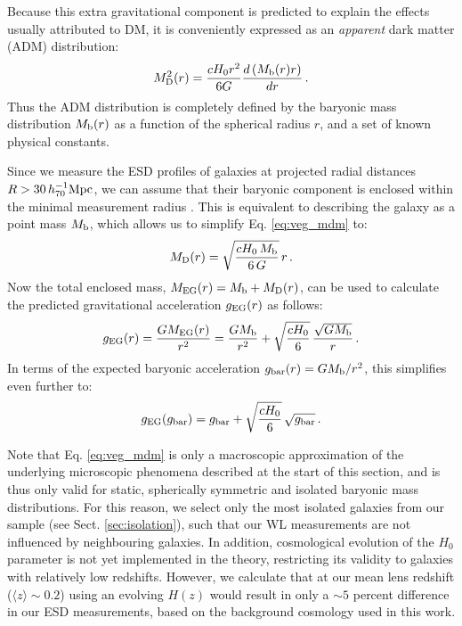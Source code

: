 \documentclass[usenatbib]{mnras}
\newcommand{\hsMpc}{\, h_{70}^{-1}{\rm{Mpc}} }
\newcommand{\un}[1]{_{\rm #1}}
\begin{document}
Because this extra gravitational component is predicted to explain the effects usually attributed to DM, it is conveniently expressed as an \emph{apparent} dark matter (ADM) distribution:
\begin{equation}
M\un{D}^2 (r) = \frac{  cH_0 r^2}{6G} \frac{d\left( M\un{b}(r) r \right)}{dr} \, .
\label{eq:veg_mdm}
\end{equation}
Thus the ADM distribution is completely defined by the baryonic mass distribution $M\un{b}(r)$ as a function of the spherical radius $r$, and a set of known physical constants.

Since we measure the ESD profiles of galaxies at projected radial distances $R>30 \hsMpc$, we can assume that their baryonic component is enclosed within the minimal measurement radius \cite[see also][]{brouwer2017}. This is equivalent to describing the galaxy as a point mass $M\un{b}$, which allows us to simplify Eq. \ref{eq:veg_mdm} to:
\begin{equation}
M\un{D}(r)=\sqrt{\frac{cH_{0} \, M\un{b}}{6 \, G}} \, r \, .
\end{equation}
Now the total enclosed mass, $M\un{EG}(r) = M\un{b} + M\un{D}(r)$, can be used to calculate the predicted gravitational acceleration $g\un{EG}(r)$ as follows:
\begin{equation}
	g\un{EG}(r) = \frac{G M\un{EG}(r)}{r^2} = \frac{G M\un{b}}{r^2} + \sqrt{\frac{cH_{0}}{6}} \, \frac{\sqrt{G M\un{b}}}{r} \, .
\end{equation}
In terms of the expected baryonic acceleration $g\un{bar}(r) = G M\un{b}/r^2$, this simplifies even further to:
\begin{equation}
\label{eq:rar_verlinde}
g\un{EG}(g\un{bar}) = g\un{bar} + \sqrt{\frac{cH_{0}}{6}} \, \sqrt{g\un{bar}} \, .
\end{equation}

Note that Eq. \ref{eq:veg_mdm} is only a macroscopic approximation of the underlying microscopic phenomena described at the start of this section, and is thus only valid for static, spherically symmetric and isolated baryonic mass distributions. For this reason, we select only the most isolated galaxies from our sample (see Sect. \ref{sec:isolation}), such that our WL measurements are not influenced by neighbouring galaxies. In addition, cosmological evolution of the $H_0$ parameter is not yet implemented in the theory, restricting its validity to galaxies with relatively low redshifts. However, we calculate that at our mean lens redshift ($\langle z \rangle \sim 0.2$) using an evolving $H(z)$ would result in only a $\sim5$ percent difference in our ESD measurements, based on the background cosmology used in this work.
\end{document}
